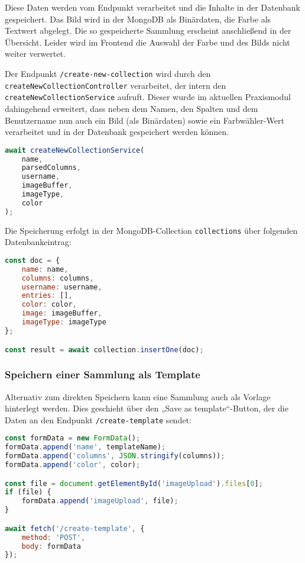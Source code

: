 Diese Daten werden vom Endpunkt  verarbeitet und die Inhalte in der Datenbank gespeichert.
Das Bild wird in der MongoDB als Binärdaten, die Farbe als Textwert abgelegt.
Die so gespeicherte Sammlung erscheint anschließend in der Übersicht.
Leider wird im Frontend die Auswahl der Farbe und des Bilds nicht weiter verwertet.

Der Endpunkt \texttt{/create-new-collection} wird durch den \texttt{createNewCollectionController} verarbeitet, der intern den \texttt{createNewCollectionService} aufruft.
Dieser wurde im aktuellen Praxismodul dahingehend erweitert, dass neben dem Namen, den Spalten und dem Benutzername nun auch ein Bild (als Binärdaten) sowie ein Farbwähler-Wert verarbeitet und in der Datenbank gespeichert werden können.

\begin{lstlisting}[language=JavaScript, caption=Service-Aufruf im Controller]
await createNewCollectionService(
    name,
    parsedColumns,
    username,
    imageBuffer,
    imageType,
    color
);
\end{lstlisting}

Die Speicherung erfolgt in der MongoDB-Collection \texttt{collections} über folgenden Datenbankeintrag:

\begin{lstlisting}[language=JavaScript, caption=Dokumentstruktur im Service]
const doc = {
    name: name,
    columns: columns,
    username: username,
    entries: [],
    color: color,
    image: imageBuffer,
    imageType: imageType
};

const result = await collection.insertOne(doc);
\end{lstlisting}

\subsubsection{Speichern einer Sammlung als Template}\label{subsubsec:save-as-template}

Alternativ zum direkten Speichern kann eine Sammlung auch als Vorlage hinterlegt werden.
Dies geschieht über den „Save as template“-Button, der die Daten an den Endpunkt \texttt{/create-template} sendet:

\begin{lstlisting}[language=JavaScript, caption=Clientseitiges Speichern einer Sammlung als Vorlage]
const formData = new FormData();
formData.append('name', templateName);
formData.append('columns', JSON.stringify(columns));
formData.append('color', color);

const file = document.getElementById('imageUpload').files[0];
if (file) {
    formData.append('imageUpload', file);
}

await fetch('/create-template', {
    method: 'POST',
    body: formData
});
\end{lstlisting}

